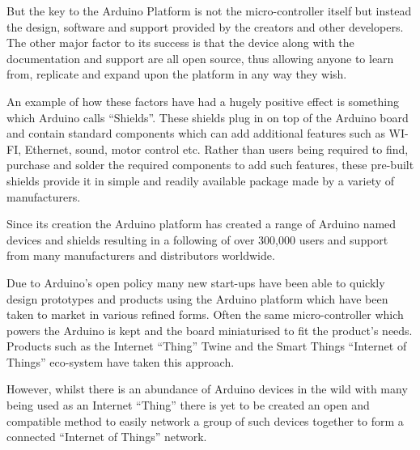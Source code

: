 \documentclass{l4proj}
\begin{document}
But the key to the Arduino Platform is not the micro-controller itself but instead the design, software and support provided by the creators and other developers. The other major factor to its success is that the device along with the documentation and support are all open source, thus allowing anyone to learn from, replicate and expand upon the platform in any way they wish.

An example of how these factors have had a hugely positive effect is something which Arduino calls ``Shields''. These shields plug in on top of the Arduino board and contain standard components which can add additional features such as WI-FI, Ethernet, sound, motor control etc. Rather than users being required to find, purchase and solder the required components to add such features, these pre-built shields provide it in simple and readily available package made by a variety of manufacturers.

Since its creation the Arduino platform has created a range of Arduino named devices and shields resulting in a following of over 300,000 users\cite{ArduinoNumbers} and support from many manufacturers and distributors worldwide. 

Due to Arduino's open policy many new start-ups have been able to quickly design prototypes and products using the Arduino platform which have been taken to market in various refined forms. Often the same micro-controller which powers the Arduino is kept and the board miniaturised to fit the product's needs. Products such as the Internet ``Thing'' Twine\cite{Twine} and the Smart Things ``Internet of Things'' eco-system have taken this approach\cite{SmartThings}.

However, whilst there is an abundance of Arduino devices in the wild with many being used as an Internet ``Thing'' there is yet to be created an open and compatible method to easily network a group of such devices together to form a connected ``Internet of Things'' network.

\begin{comment}
OPEN SOURCE
Micro-controller, cheap, easy, PIC chips were difficult, lowered barrier of entry, provided large support and huge following
Italian made, several iterations on size and power
Good starting point for development as there are many in existence
Well adopted
Based on C/C++ with a few tweaks, offers shields for expandability i.e. Ethernet, WI-FI
very good at sensing and doing things
16MHz
no threading
\end{comment}
\end{document}
